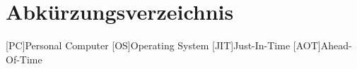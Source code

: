 \chapter*{Abkürzungsverzeichnis}
\begin{acronym}
    [PC]{Personal Computer}
    [OS]{Operating System}
    [JIT]{Just-In-Time}
    [AOT]{Ahead-Of-Time}
    
\end{acronym}